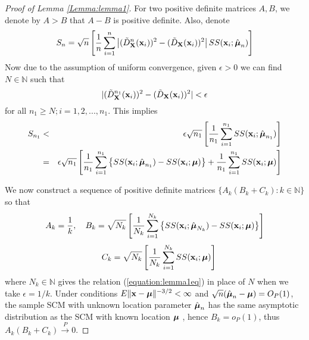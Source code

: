 \begin{proof}[Proof of Lemma \ref{Lemma:lemma1}]
For two positive definite matrices $A,B$, we denote by $A>B$ that $A-B$ is positive definite. Also, denote
%
$$ S_n = \sqrt n \left[ \frac{1}{n} \sum_{i=1}^n \left| (\tilde D^{n} _{\mathbf{X}} ({\bf{x}}_i))^2  - (\tilde D_{\mathbf{X}} ({\bf{x}}_i))^2 \right| SS({\bf{x}}_i; \hat{{\boldsymbol{\mu}}}_n) \right] $$
%
Now due to the assumption of uniform convergence, given $\epsilon>0$ we can find $N \in \mathbb{N}$ such that
%
\begin{equation}
\label{equation:lemma1eq}
| (\tilde D^{n_1}_{\mathbf{X}}({\bf{x}}_i))^2 - (\tilde D_{\mathbf{X}}({\bf{x}}_i))^2 | < \epsilon
\end{equation}
%
for all $n_1 \geq N; i = 1,2,...,n_1$. This implies
%
\begin{eqnarray}
\label{eqn:lemma1eq2}
S_{n_1} &< & \epsilon \sqrt{n_1} \left[ \frac{1}{n_1} \sum_{i=1}^{n_1} SS({\bf{x}}_i; \hat{{\boldsymbol{\mu}}}_{n_1}) \right]\notag\\
&=& \epsilon \sqrt{n_1} \left[ \frac{1}{n_1} \sum_{i=1}^{n_1} \left\{ SS({\bf{x}}_i; \hat{{\boldsymbol{\mu}}}_{n_1}) - SS({\bf{x}}_i; {\boldsymbol{\mu}}) \right\} + \frac{1}{n_1} \sum_{i=1}^{n_1} SS({\bf{x}}_i; {\boldsymbol{\mu}}) \right]
\end{eqnarray}

We now construct a sequence of positive definite matrices $\{A_k (B_k+C_k) : k \in \mathbb N\} $ so that
%
$$ A_k = \frac{1}{k}, \quad B_k = \sqrt{N_k} \left[ \frac{1}{N_k} \sum_{i=1}^{N_k} \left\{ SS({\bf{x}}_i; \hat{{\boldsymbol{\mu}}}_{N_k}) - SS({\bf{x}}_i; {\boldsymbol{\mu}}) \right\} \right]$$
$$\quad C_k = \sqrt{N_k} \left[ \frac{1}{N_k} \sum_{i=1}^{N_k} SS({\bf{x}}_i; {\boldsymbol{\mu}}) \right] $$
%
where $N_k \in \mathbb N$ gives the relation (\ref{equation:lemma1eq}) in place of $N$ when we take $\epsilon = 1/k$. Under conditions $ E\|{\bf{x}} - {\boldsymbol{\mu}}\|^{-3/2} < \infty $ and $\sqrt n (\hat{{\boldsymbol{\mu}}}_n - {\boldsymbol{\mu}}) = O_P(1)$, the sample SCM with unknown location parameter $\hat{{\boldsymbol{\mu}}}_n$ has the same asymptotic distribution as the SCM with known location ${\boldsymbol{\mu}}$ \citep{durre14}, hence $B_k = o_P(1)$, thus $A_k (B_k+C_k) \stackrel{P}{\rightarrow} 0$.


\end{proof}
